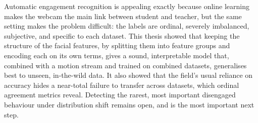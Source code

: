 \documentclass[../main.tex]{subfiles}
\begin{document}
Automatic engagement recognition is appealing exactly because online learning makes the webcam the main link between student and teacher, but the same setting makes the problem difficult: the labels are ordinal, severely imbalanced, subjective, and specific to each dataset. This thesis showed that keeping the structure of the facial features, by splitting them into feature groups and encoding each on its own terms, gives a sound, interpretable model that, combined with a motion stream and trained on combined datasets, generalises best to unseen, in-the-wild data. It also showed that the field's usual reliance on accuracy hides a near-total failure to transfer across datasets, which ordinal agreement metrics reveal. Detecting the rarest, most important disengaged behaviour under distribution shift remains open, and is the most important next step.
\end{document}
